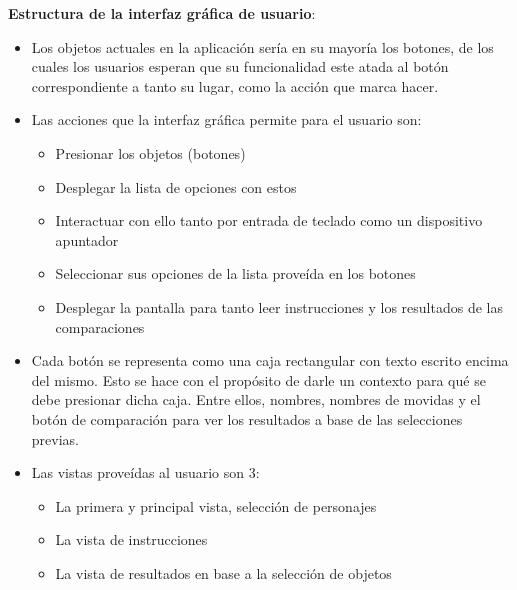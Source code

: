 
\textbf{Estructura de la interfaz gráfica de usuario}:

\begin{itemize}
    \item Los objetos actuales en la aplicación sería en su mayoría los botones, de los cuales los usuarios esperan que su funcionalidad este atada al botón correspondiente a tanto su lugar, como la acción que marca hacer.
    \item Las acciones que la interfaz gráfica permite para el usuario son:
    \begin{itemize}
        \item Presionar los objetos (botones)
        \item Desplegar la lista de opciones con estos
        \item Interactuar con ello tanto por entrada de teclado como un dispositivo apuntador
        \item Seleccionar sus opciones de la lista proveída en los botones
        \item Desplegar la pantalla para tanto leer instrucciones y los resultados de las comparaciones
    \end{itemize}
    \item Cada botón se representa como una caja rectangular con texto escrito encima del mismo. Esto se hace con el propósito de darle un contexto para qué se debe presionar dicha caja. Entre ellos, nombres, nombres de movidas y el botón de comparación para ver los resultados a base de las selecciones previas.
    \item Las vistas proveídas al usuario son 3:
    \begin{itemize}
        \item La primera y principal vista, selección de personajes
        \item La vista de instrucciones
        \item La vista de resultados en base a la selección de objetos

\end{itemize}
\end{itemize}
